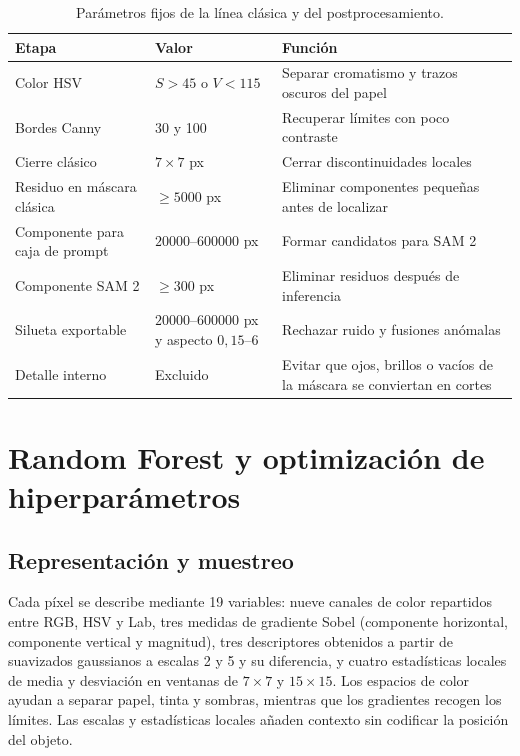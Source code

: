 \begin{table}[htbp]
\centering
\small
\caption{Parámetros fijos de la línea clásica y del postprocesamiento.}
\label{tab:parametros_clasicos}
\begin{tabularx}{\textwidth}{p{3.3cm}p{2.7cm}Y}
\toprule
\textbf{Etapa} & \textbf{Valor} & \textbf{Función} \\
\midrule
Color HSV & $S>45$ o $V<115$ & Separar cromatismo y trazos oscuros del papel \\
Bordes Canny & 30 y 100 & Recuperar límites con poco contraste \\
Cierre clásico & $7\times7$ px & Cerrar discontinuidades locales \\
Residuo en máscara clásica & $\geq5000$ px & Eliminar componentes pequeñas antes de localizar \\
Componente para caja de prompt & $20000$--$600000$ px & Formar candidatos para SAM 2 \\
Componente SAM 2 & $\geq300$ px & Eliminar residuos después de inferencia \\
Silueta exportable & $20000$--$600000$ px y aspecto $0{,}15$--$6$ & Rechazar ruido y fusiones anómalas \\
Detalle interno & Excluido & Evitar que ojos, brillos o vacíos de la máscara se conviertan en cortes \\
\bottomrule
\end{tabularx}
\end{table}

\section{Random Forest y optimización de hiperparámetros}

\subsection{Representación y muestreo}

Cada píxel se describe mediante 19 variables: nueve canales de color repartidos entre RGB, HSV y Lab, tres medidas de gradiente Sobel (componente horizontal, componente vertical y magnitud), tres descriptores obtenidos a partir de suavizados gaussianos a escalas 2 y 5 y su diferencia, y cuatro estadísticas locales de media y desviación en ventanas de $7\times7$ y $15\times15$. Los espacios de color ayudan a separar papel, tinta y sombras, mientras que los gradientes recogen los límites. Las escalas y estadísticas locales añaden contexto sin codificar la posición del objeto.

